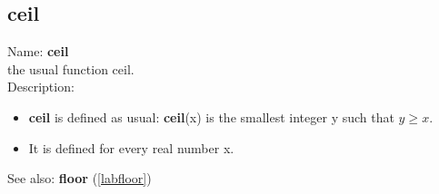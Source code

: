 \subsection{ceil}
\label{labceil}
\noindent Name: \textbf{ceil}\\
the usual function ceil.\\
\noindent Description: \begin{itemize}

\item \textbf{ceil} is defined as usual: \textbf{ceil}(x) is the smallest integer y such that $y \ge x$.

\item It is defined for every real number x.
\end{itemize}
See also: \textbf{floor} (\ref{labfloor})
